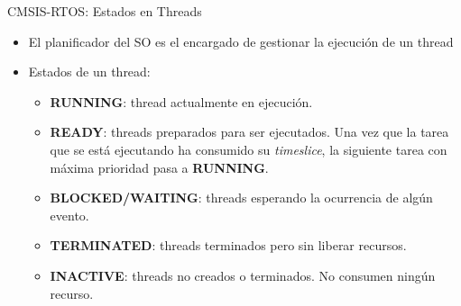 \begin{frame}{CMSIS-RTOS: Estados en Threads}
    \begin{itemize}
        \item El planificador del SO es el encargado de gestionar la ejecución de un thread
        \item Estados de un thread:
       \begin{itemize}
          \item \textbf{RUNNING}: thread actualmente en ejecución.
          \item \textbf{READY}: threads preparados para ser ejecutados. Una vez que la tarea que se está ejecutando ha consumido su \textit{timeslice}, la siguiente tarea con máxima prioridad pasa a \textbf{RUNNING}.
          \item \textbf{BLOCKED/WAITING}: threads esperando la ocurrencia de algún evento.
          \item \textbf{TERMINATED}: threads terminados pero sin liberar recursos.
          \item \textbf{INACTIVE}: threads no creados o terminados. No consumen ningún recurso.
        \end{itemize}
    \end{itemize}
    
\end{frame}


